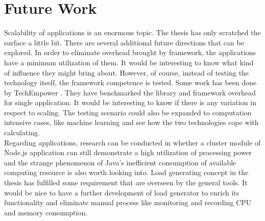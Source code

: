 \chapter{Future Work}
Scalability of applications is an enormous topic. The thesis has only scratched the surface a little bit. There are several additional future directions that can be explored. In order to eliminate overhead brought by framework, the applications have a minimum utilization of them. It would be interesting to know what kind of influence they might bring about. However, of course, instead of testing the technology itself, the framework competence is tested. Some work has been done by TechEmpower \citep{Benchmark}. They have benchmarked the library and framework overhead for single application. It would be interesting to know if there is any variation in respect to scaling. The testing scenario could also be expanded to computation intensive cases, like machine learning and see how the two technologies cope with calculating. \\
Regarding applications, research can be conducted in whether a cluster module of Node.js application can still demonstrate a high utilization of processing power and the strange phenomenon of Java's inefficient consumption of available computing resource is also worth looking into. Load generating concept in the thesis has fulfilled some requirement that are overseen by the general tools. It would be nice to have a further development of load generator to enrich its functionality and eliminate manual process like monitoring and recording CPU and memory consumption. \\